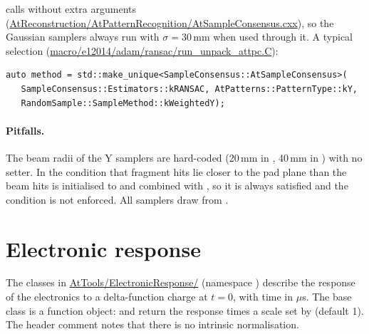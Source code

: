 \noindent
{} calls  without extra arguments
(\url{AtReconstruction/AtPatternRecognition/AtSampleConsensus.cxx}), so the Gaussian samplers always run with
$\sigma = 30$\,mm when used through it. A typical selection (\url{macro/e12014/adam/ransac/run_unpack_attpc.C}):
\begin{verbatim}
auto method = std::make_unique<SampleConsensus::AtSampleConsensus>(
   SampleConsensus::Estimators::kRANSAC, AtPatterns::PatternType::kY,
   RandomSample::SampleMethod::kWeightedY);
\end{verbatim}

\paragraph{Pitfalls.}
The beam radii of the Y samplers are hard-coded (20\,mm in , 40\,mm in ) with no setter.
In  the condition that fragment hits lie closer to the pad plane than the beam hits is
initialised to  and combined with \code{|=}, so it is always satisfied and the condition is not enforced.
All samplers draw from .

\section{Electronic response}

The classes in \url{AtTools/ElectronicResponse/} (namespace ) describe the response of the
electronics to a delta-function charge at $t = 0$, with time in $\mu$s. The base class  is a
function object:  and  return the response times a scale set by
 (default 1). The header comment notes that there is no intrinsic normalisation.

